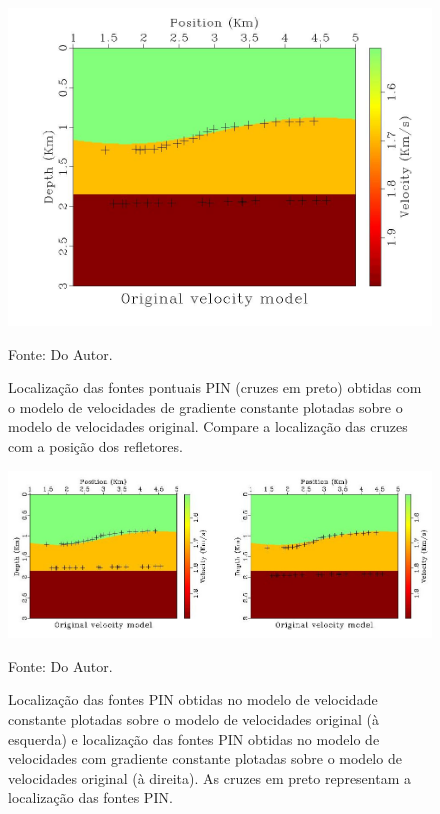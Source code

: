 \begin{figure}[H]
\caption{Localização das fontes pontuais PIN (cruzes em preto)
obtidas com o modelo de velocidades de gradiente
constante plotadas sobre o modelo de velocidades original.
Compare a localização das cruzes com a posição dos refletores.}
\begin{center}
\includegraphics[scale=0.3]{images/gzvel.jpeg}
\vspace{-0.3cm}
\end{center}
\begin{center}
 Fonte: Do Autor.
\end{center}
\label{fig:10.4}
\end{figure}


\begin{figure}[H]
\caption{Localização das fontes PIN obtidas no modelo de velocidade constante
plotadas sobre o modelo de velocidades original (à esquerda)
e localização das fontes PIN obtidas no modelo de velocidades com gradiente constante
plotadas sobre o modelo de velocidades original (à direita).
As cruzes em preto representam a localização das fontes PIN.}
\begin{center}
\includegraphics[scale=2]{images/resultinv.jpeg}
\vspace{-0.3cm}
\end{center}
\begin{center}
 Fonte: Do Autor.
\end{center}
\label{fig:10.5}
\end{figure}
